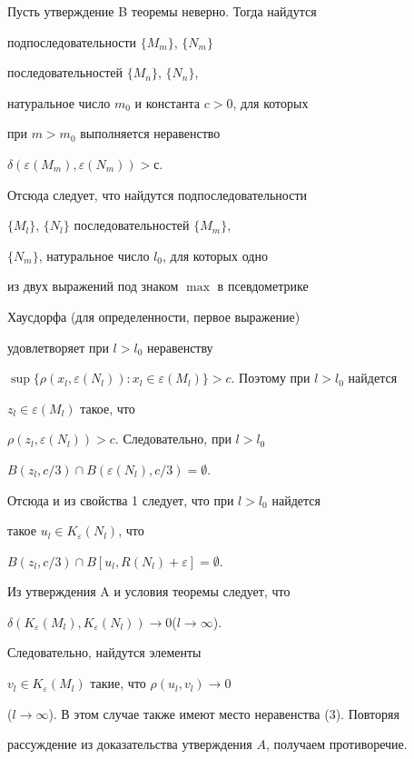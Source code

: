 Пусть утверждение B теоремы неверно. Тогда найдутся 


подпоследовательности $\{M_{m}\}$, $\{N_{m}\}$


последовательностей $\{M_{n}\}$, $\{N_{n}\}$,


натуральное число $m_{0}$ и константа $c > 0$, для которых 


при $m > m_{0}$ выполняется неравенство


$\delta (\varepsilon (M_{m}),\varepsilon (N_{m})) > с$.


Отсюда следует, что найдутся подпоследовательности


$\{M_{l}\}$, $\{N_{l}\}$ последовательностей $\{M_{m}\}$, 


$\{N_{m}\}$, натуральное число $l_{0}$, для которых одно


из двух выражений под знаком $\max$ в псевдометрике


Хаусдорфа (для определенности, первое выражение)


удовлетворяет при $l > l_{0}$ неравенству 


$\sup\{\rho(x_{l},\varepsilon (N_{l})) :


x_{l} \in \varepsilon (M_{l})\} > c$. Поэтому при $l > l_{0}$ найдется 


$z_{l} \in \varepsilon (M_{l})$ такое, что


$\rho(z_{l},\varepsilon (N_{l})) > c$. Следовательно, при $l > l_{0}$\;


$B(z_{l},c/3) \cap B(\varepsilon (N_{l}),c/3) = \emptyset$.


Отсюда и из свойства 1 следует, что при $l > l_{0}$ найдется 


такое $u_{l} \in K_{\varepsilon }(N_{l})$, что


$B(z_{l},c/3) \cap B[u_{l},R(N_{l}) + \varepsilon ] = \emptyset$. 


Из утверждения A и условия теоремы следует, что 


$\delta (K_{\varepsilon }(M_{l}),


K_{\varepsilon }(N_{l})) \to 0$($l \to \infty $).


Следовательно, найдутся элементы 


$v_{l} \in K_{\varepsilon }(M_{l})$ такие, что $\rho (u_{l},v_{l}) \to 0$


($l \to \infty $). В этом случае также имеют место неравенства (3). Повторяя 


рассуждение из доказательства утверждения $A$, получаем противоречие.





